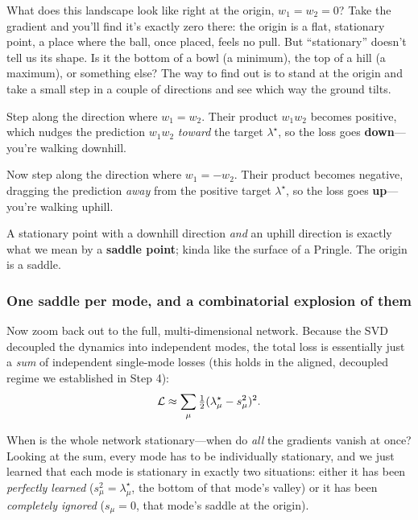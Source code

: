 What does this landscape look like right at the origin, $w_1 = w_2 = 0$? Take the
gradient and you'll find it's exactly zero there: the origin is a flat, stationary
point, a place where the ball, once placed, feels no pull. But ``stationary''
doesn't tell us its shape. Is it the bottom of a bowl (a minimum), the top of a
hill (a maximum), or something else? The way to find out is to stand at the origin
and take a small step in a couple of directions and see which way the ground
tilts.

Step along the direction where $w_1 = w_2$. Their product $w_1 w_2$ becomes
positive, which nudges the prediction $w_1 w_2$ \emph{toward} the target
$\lambda^\star$, so the loss goes \textbf{down}---you're walking downhill.

Now step along the direction where $w_1 = -w_2$. Their product becomes negative,
dragging the prediction \emph{away} from the positive target $\lambda^\star$, so
the loss goes \textbf{up}---you're walking uphill.

A stationary point with a downhill direction \emph{and} an uphill direction is
exactly what we mean by a \textbf{saddle point}; kinda like the surface of a Pringle. The origin is a saddle.

\subsubsection*{One saddle per mode, and a combinatorial explosion of
them}

Now zoom back out to the full, multi-dimensional network. Because the SVD decoupled the dynamics into independent
modes, the total loss is essentially just a \emph{sum} of independent single-mode
losses (this holds in the
aligned, decoupled regime we established in Step 4):
\begin{align*}
    \mathcal{L} \approx \sum_{\mu} \tfrac{1}{2}(\lambda^\star_\mu - s_\mu^2)^2.
\end{align*}

When is the whole network stationary---when do \emph{all} the gradients vanish at
once? Looking at the sum, every mode has to be individually stationary, and we
just learned that each mode is stationary in exactly two situations: either it has
been \emph{perfectly learned} ($s_\mu^2 = \lambda^\star_\mu$, the bottom of that
mode's valley) or it has been \emph{completely ignored} ($s_\mu = 0$, that mode's
saddle at the origin).

